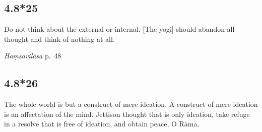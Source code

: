 \begin{ekdosis}
\begin{testimonia}[hp04_008_24]

\end{testimonia}


\subsection*{4.8*25}
\begin{translation}[hp04_008_25]
Do not think about the external or internal. [The yogi] should abandon all thought and think of nothing at all.
\end{translation}


\begin{testimonia}[hp04_008_25]
\emph{Haṃsavilāsa} p.~48
\begin{versinnote}
\end{versinnote}
\end{testimonia}


\subsection*{4.8*26}
\begin{translation}[hp04_008_26]
The whole world is but a construct of mere ideation. A construct of mere ideation is an affectation of the mind. Jettison thought that is only ideation, take refuge in a resolve that is free of ideation, and obtain peace, O Rāma.
\end{translation}


\end{ekdosis}
